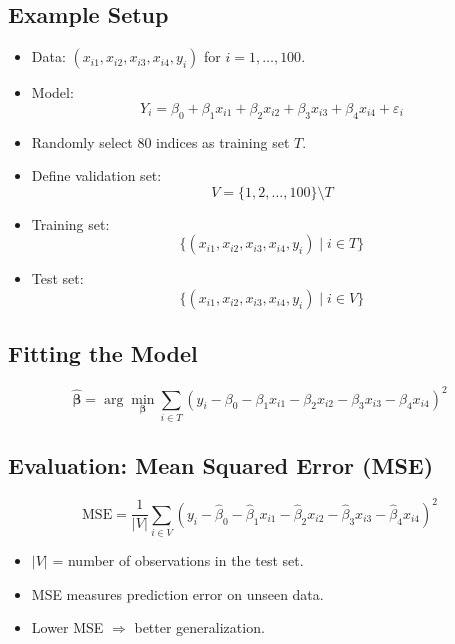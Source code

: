 \subsection{Example Setup}

\begin{itemize}
\item Data: $(x_{i1}, x_{i2}, x_{i3}, x_{i4}, y_i)$ for $i = 1, \dots, 100$.

\item Model:
\[
Y_i = \beta_0 + \beta_1 x_{i1} + \beta_2 x_{i2} + \beta_3 x_{i3} + \beta_4 x_{i4} + \varepsilon_i
\]

\item Randomly select 80 indices as training set $T$.

\item Define validation set:
\[
V = \{1,2,\dots,100\} \setminus T
\]

\item Training set:
\[
\{(x_{i1}, x_{i2}, x_{i3}, x_{i4}, y_i) \mid i \in T\}
\]

\item Test set:
\[
\{(x_{i1}, x_{i2}, x_{i3}, x_{i4}, y_i) \mid i \in V\}
\]
\end{itemize}

\subsection{Fitting the Model}

\[
\hat{\boldsymbol{\beta}}
= \arg\min_{\boldsymbol{\beta}}
\sum_{i \in T}
\left(y_i - \beta_0 - \beta_1 x_{i1} - \beta_2 x_{i2} - \beta_3 x_{i3} - \beta_4 x_{i4}\right)^2
\]

\subsection{Evaluation: Mean Squared Error (MSE)}

\begin{keyresult}
\[
\text{MSE}
= \frac{1}{|V|}
\sum_{i \in V}
\left(y_i - \hat{\beta}_0 - \hat{\beta}_1 x_{i1} - \hat{\beta}_2 x_{i2} - \hat{\beta}_3 x_{i3} - \hat{\beta}_4 x_{i4}\right)^2
\]

\begin{itemize}
\item $|V|$ = number of observations in the test set.

\item MSE measures prediction error on unseen data.

\item Lower MSE $\Rightarrow$ better generalization.
\end{itemize}
\end{keyresult}

